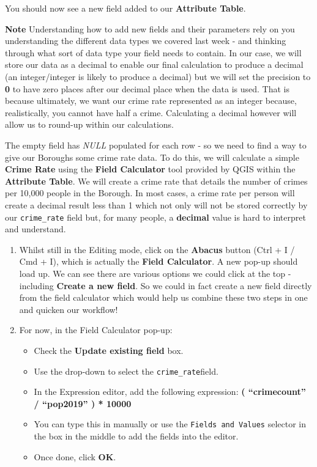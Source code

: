 \documentclass[
]{book}
\providecommand{\tightlist}{%
  \setlength{\itemsep}{0pt}\setlength{\parskip}{0pt}}
\begin{document}
You should now see a new field added to our \textbf{Attribute Table}.

\textbf{Note}
Understanding how to add new fields and their parameters rely on you understanding the different data types we covered last week - and thinking through what sort of data type your field needs to contain. In our case, we will store our data as a decimal to enable our final calculation to produce a decimal (an integer/integer is likely to produce a decimal) but we will set the precision to \textbf{0} to have zero places after our decimal place when the data is used. That is because ultimately, we want our crime rate represented as an integer because, realistically, you cannot have half a crime. Calculating a decimal however will allow us to round-up within our calculations.

The empty field has \emph{NULL} populated for each row - so we need to find a way to give our Boroughs some crime rate data. To do this, we will calculate a simple \textbf{Crime Rate} using the \textbf{Field Calculator} tool provided by QGIS within the \textbf{Attribute Table}. We will create a crime rate that details the number of crimes per 10,000 people in the Borough. In most cases, a crime rate per person will create a decimal result less than 1 which not only will not be stored correctly by our \texttt{crime\_rate} field but, for many people, a \textbf{decimal} value is hard to interpret and understand.

\begin{enumerate}
\def\labelenumi{\arabic{enumi}.}
\setcounter{enumi}{8}
\item
  Whilst still in the Editing mode, click on the \textbf{Abacus} button (Ctrl + I / Cmd + I), which is actually the \textbf{Field Calculator}. A new pop-up should load up. We can see there are various options we could click at the top - including \textbf{Create a new field}. So we could in fact create a new field directly from the field calculator which would help us combine these two steps in one and quicken our workflow!
\item
  For now, in the Field Calculator pop-up:

  \begin{itemize}
  \tightlist
  \item
    Check the \textbf{Update existing field} box.
  \item
    Use the drop-down to select the \texttt{crime\_rate}field.
  \item
    In the Expression editor, add the following expression: \textbf{( ``crimecount'' / ``pop2019'' ) * 10000}
  \item
    You can type this in manually or use the \texttt{Fields\ and\ Values} selector in the box in the middle to add the fields into the editor.
  \item
    Once done, click \textbf{OK}.
  \end{itemize}
\end{enumerate}
\end{document}
